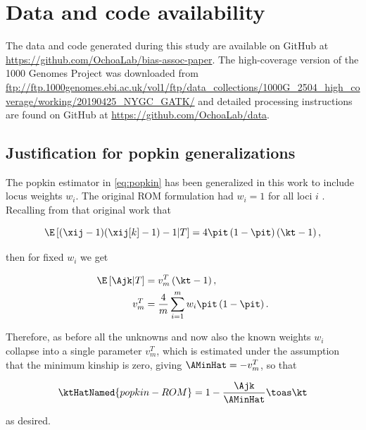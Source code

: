 \documentclass[11pt]{article}
\begin{document}
\begin{linenumbers}
\section*{Data and code availability}
The data and code generated during this study are available on GitHub at \url{https://github.com/OchoaLab/bias-assoc-paper}.
The high-coverage version of the 1000 Genomes Project was downloaded from \url{ftp://ftp.1000genomes.ebi.ac.uk/vol1/ftp/data_collections/1000G_2504_high_coverage/working/20190425_NYGC_GATK/}
and detailed processing instructions are found on GitHub at \url{https://github.com/OchoaLab/data}.


\printbibliography


\begin{appendices}
  \appendix

  \appendixpage
  
  \section{Justification for popkin generalizations}

  \label{sec:popkin_w_justif}

  The popkin estimator in \cref{eq:popkin} has been generalized in this work to include locus weights $w_i$.
  The original ROM formulation had $w_i=1$ for all loci $i$ \citep{ochoa_estimating_2021}.
  Recalling from that original work that
  \begin{linenomath*}
  $$
  \E \left[ (\xij-1)(\xij[k]-1) - 1 \middle| T \right]
  =
  4 \pit \left( 1 - \pit \right) \left( \kt - 1 \right),
  $$
  \end{linenomath*}
  then for fixed $w_i$ we get
  \begin{linenomath*}
  \begin{align*}
    \E \left[ \Ajk \middle| T \right]
    &=
      v_m^T \left( \kt - 1 \right)
      , \\
    v_m^T
    &=
      \frac{4}{m} \sum_{i=1}^m w_i \pit \left( 1 - \pit \right)
      .
  \end{align*}
  \end{linenomath*}
  Therefore, as before all the unknowns \pit and now also the known weights $w_i$ collapse into a single parameter $v_m^T$, which is estimated under the assumption that the minimum kinship is zero, giving $\AMinHat = -v_m^T$, so that
  \begin{linenomath*}
  $$
  \ktHatNamed{popkin-ROM}
  =
  1 - \frac{\Ajk}{\AMinHat}
  \toas
  \kt
  $$
  \end{linenomath*}
  as desired.


\end{appendices}
\end{linenumbers}
\end{document}

